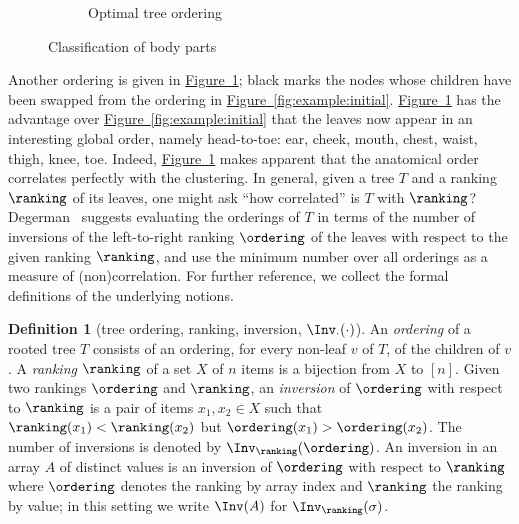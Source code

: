 \documentclass[11pt]{article}
\numberwithin{equation}{section}
\theoremstyle{definition}
\newtheorem{definition}[theorem]{Definition}
\theoremstyle{plain}
\newcommand{\expref}[2]{\hyperref[#2]{#1~\ref{#2}}}
\begin{document}
\begin{figure}[ht]
\begin{subfigure}[b]{0.45\textwidth}
\caption{Optimal tree ordering}\label{fig:example:optimal}
\end{subfigure}
\caption{Classification of body parts}\label{fig:example}
\end{figure}

Another ordering is given in \expref{Figure}{fig:example:optimal}; black marks the nodes whose children have been swapped from the ordering in \expref{Figure}{fig:example:initial}. \expref{Figure}{fig:example:optimal} has the advantage over \expref{Figure}{fig:example:initial} that the leaves now appear in an interesting global order, namely head-to-toe: ear, cheek, mouth, chest, waist, thigh, knee, toe. Indeed, \expref{Figure}{fig:example:optimal} makes apparent that the anatomical order correlates perfectly with the clustering. In general, given a tree $T$ and a ranking $\ranking$ of its leaves, one might ask ``how correlated'' is $T$ with $\ranking$? Degerman~\cite{Degerman1982} suggests evaluating the orderings of $T$ in terms of the number of inversions of the left-to-right ranking $\ordering$ of the leaves with respect to the given ranking $\ranking$, and use the minimum number over all orderings as a measure of (non)correlation. For further reference, we collect the formal definitions of the underlying notions.
\begin{definition}[tree ordering, ranking, inversion, $\Inv_{\cdot}(\cdot)$]
An \emph{ordering} of a rooted tree $T$ consists of an ordering, for every non-leaf $v$ of $T$, of the children of $v$. 
A \emph{ranking} $\ranking$ of a set $X$ of $n$ items is a bijection from $X$ to $[n]$. 
Given two rankings $\ordering$ and $\ranking$, an \emph{inversion} of $\ordering$ with respect to $\ranking$ is a pair of items $x_1,x_2\in X$ such that $\ranking(x_1) < \ranking(x_2)$ but $\ordering(x_1) > \ordering(x_2)$. The number of inversions is denoted by $\Inv_\ranking(\ordering)$.
An inversion in an array $A$ of
%
%
%
distinct values is an inversion of $\ordering$ with respect to $\ranking$ where $\ordering$ denotes the ranking by array index and $\ranking$ the ranking by value; in this setting we write $\Inv(A)$ for $\Inv_\ranking(\sigma)$.
\end{definition}
\end{document}
